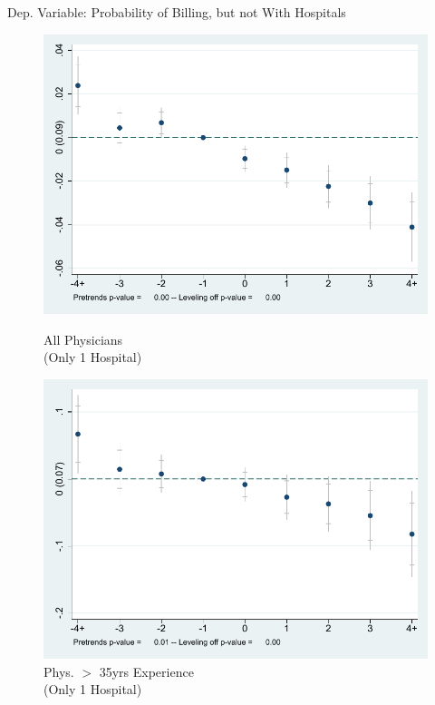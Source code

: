 \documentclass[10pt]{beamer}
\begin{document}
\begin{frame}{Dep. Variable: Probability of Billing, but not With Hospitals}
\begin{figure}[ht]
        \begin{minipage}[b]{0.47\linewidth}
            \centering
            \includegraphics[width=\textwidth]{Objects/xtevent_hosp_fullsample_ind.pdf}
            \caption{\small All Physicians \\(Only 1 Hospital)}
        \end{minipage}
        \hspace{0.2cm}
        \begin{minipage}[b]{0.47\linewidth}
            \centering
            \includegraphics[width=\textwidth]{Objects/xtevent_hosp_oldsample_ind.pdf}
            \caption{\small Phys. $>$ 35yrs Experience\\ (Only 1 Hospital)}
        \end{minipage}
    \end{figure}
\end{frame}
\end{document}
